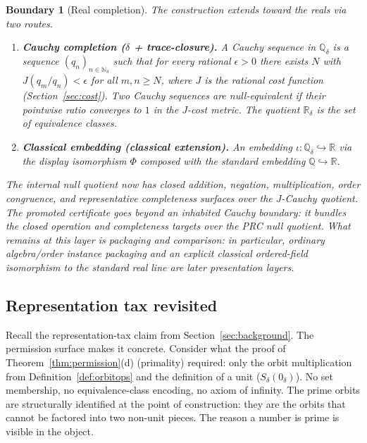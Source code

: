 \documentclass[11pt,a4paper]{article}
\newtheorem{boundary}[theorem]{Boundary}
\theoremstyle{definition}
\theoremstyle{remark}
\begin{document}
\begin{boundary}[Real completion]\label{bnd:real}
The construction extends toward the reals via two routes.
\begin{enumerate}[leftmargin=2em, label=(\roman*)]
  \item \textbf{Cauchy completion ($\delta$ + trace-closure).} A Cauchy
    sequence in $\mathbb{Q}_\delta$ is a sequence $(q_n)_{n \in
    \mathbb{N}_\delta}$ such that for every rational $\epsilon > 0$ there
    exists $N$ with $J(q_m / q_n) < \epsilon$ for all $m, n \geq N$, where
    $J$ is the rational cost function (Section~\ref{sec:cost}). Two Cauchy
    sequences are \emph{null-equivalent} if their pointwise ratio converges
    to $1$ in the $J$-cost metric. The quotient $\mathbb{R}_\delta$ is the
    set of equivalence classes.
  \item \textbf{Classical embedding (classical extension).} An embedding
    $\iota : \mathbb{Q}_\delta \hookrightarrow \mathbb{R}$ via the display
    isomorphism $\Phi$ composed with the standard embedding
    $\mathbb{Q} \hookrightarrow \mathbb{R}$.
\end{enumerate}
The internal null quotient now has closed addition, negation, multiplication,
order congruence, and representative completeness surfaces over the
$J$-Cauchy quotient. The promoted certificate goes beyond an inhabited
Cauchy boundary: it bundles the closed operation and completeness targets over
the PRC null quotient. What remains at this layer is packaging and comparison:
in particular, ordinary algebra/order instance packaging and an explicit
classical ordered-field isomorphism to the standard real line are later
presentation layers.
\end{boundary}

\subsection{Representation tax revisited}

Recall the representation-tax claim from Section~\ref{sec:background}. The
permission surface makes it concrete. Consider what the proof of
Theorem~\ref{thm:permission}(d) (primality) required: only the orbit
multiplication from Definition~\ref{def:orbitops} and the definition of
a unit ($S_\delta(0_\delta)$). No set membership, no equivalence-class
encoding, no axiom of infinity. The prime orbits are structurally
identified at the point of construction: they are the orbits that cannot
be factored into two non-unit pieces. The reason a number is prime is
visible in the object.
\end{document}
